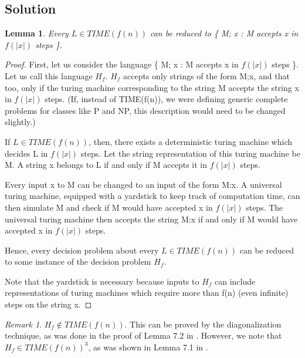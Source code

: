 \documentclass[10pt]{amsart}
\newtheorem{lem}[thm]{Lemma}
\theoremstyle{remark}
\newtheorem{rem}[thm]{Remark}
\begin{document}
\subsection{Solution}
\begin{lem}
Every $L \in TIME(f(n))$ can be reduced to \{ M; x : M accepts x in $f(|x|)$ steps \}.
\end{lem}
\begin{proof}
First, let us consider the language \{ M; x : M accepts x in $f(|x|)$ steps \}. Let us call this language $H_{f}$. $H_{f}$ accepts only strings of the form M;x, and that too, only if the turing machine corresponding to the string M accepts the string x in $f(|x|)$ steps. (If, instead of TIME(f(n)), we were defining generic complete problems for classes like P and NP, this description would need to be changed slightly.)

If $L \in TIME(f(n))$, then, there exists a deterministic turing machine which decides L in $f(|x|)$ steps. Let the string representation of this turing machine be M. A string x belongs to L if and only if M accepts it in $f(|x|)$ steps.

Every input x to M can be changed to an input of the form M:x. A universal turing machine, equipped with a yardstick to keep track of computation time, can then simulate M and check if M would have accepted x in $f(|x|)$ steps. The universal turing machine then accepts the string M:x if and only if M would have accepted x in $f(|x|)$ steps.

Hence, every decision problem about every $L \in TIME(f(n))$ can be reduced to some instance of the decision problem $H_{f}$.

Note that the yardstick is necessary because inputs to $H_{f}$ can include representations of turing machines which require more than f(n) (even infinite) steps on the string x.
\end{proof}

\begin{rem}
$H_{f} \notin TIME(f(n))$. This can be proved by the diagonalization technique, as was done in the proof of Lemma 7.2 in \cite{papadimitriouCC}. However, we note that $H_{f} \in TIME(f(n))^{3}$, as was shown in Lemma 7.1 in \cite{papadimitriouCC}.
\end{rem}
\end{document}
